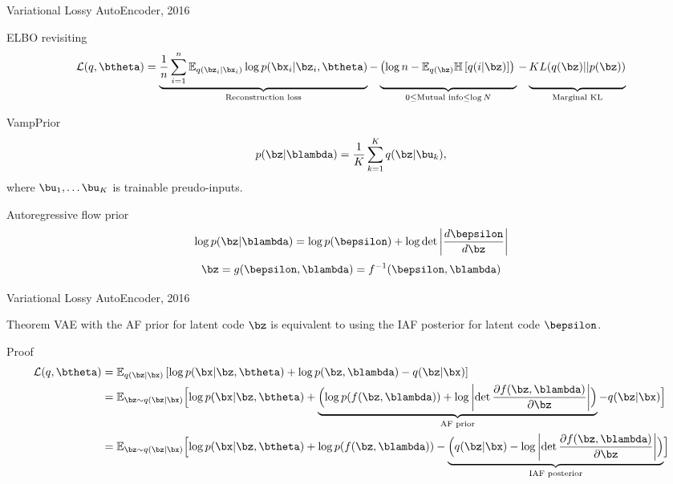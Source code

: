 \begin{frame}{Variational Lossy AutoEncoder, 2016}
	
	\begin{block}{ELBO revisiting}
		\vspace{-0.3cm}
		{\footnotesize
			\[
			\mathcal{L}(q, \btheta) = \underbrace{\frac{1}{n} \sum_{i=1}^n \mathbb{E}_{q(\bz_i | \bx_i)} \log p(\bx_i | \bz_i, \btheta)}_{\text{Reconstruction loss}} - \underbrace{\left(\log n - \mathbb{E}_{q(\bz)} \mathbb{H} \left[ q(i | \bz) \right] \right)\vphantom{\sum_{i=1}}}_{0 \leq \text{Mutual info} \leq \log N } - \underbrace{KL(q(\bz) || p(\bz))\vphantom{\sum_{i=1}}}_{\text{Marginal KL}}
			\]}
	\end{block}
	\vspace{-0.5cm}
	\begin{block}{VampPrior}
		\vspace{-0.5cm}
		\[
			p(\bz | \blambda) = \frac{1}{K} \sum_{k=1}^K q(\bz | \bu_k),
		\]
	where $\bu_1, \dots \bu_K$ is trainable preudo-inputs.
	\end{block}
	\begin{block}{Autoregressive flow prior}
		\vspace{-0.5cm}
		\[
			\log p(\bz | \blambda) = \log p(\bepsilon) + \log \det \left | \frac{d \bepsilon}{d\bz}\right|
		\]
		\[
			\bz = g(\bepsilon, \blambda) = f^{-1}(\bepsilon, \blambda) 
		\]
	\end{block}
\end{frame}
\begin{frame}{Variational Lossy AutoEncoder, 2016}
	\begin{block}{Theorem}
	VAE with the AF prior for latent code $\bz$ is equivalent to using the IAF posterior for latent code $\bepsilon$.
	\end{block}
	\begin{block}{Proof}
	\vspace{-0.5cm}
	{\footnotesize
	\begin{align*}
	\mathcal{L}(q, \btheta) &= \mathbb{E}_{q(\bz | \bx)} \left[ \log p(\bx | \bz, \btheta) +  \log p(\bz, \blambda) - q(\bz | \bx) \right] \\
	&= \mathbb{E}_{\bz \sim q(\bz | \bx)} \Bigl[ \log p(\bx | \bz, \btheta) + \underbrace{ \Bigl( \log p(f(\bz, \blambda)) + \log \left| \det \frac{\partial f(\bz, \blambda)}{\partial \bz} \right| \Bigr) }_{\text{AF prior}} - q(\bz | \bx) \Bigr] \\
	&= \mathbb{E}_{\bz \sim q(\bz | \bx)} \Bigl[ \log p(\bx | \bz, \btheta) +  \log p(f(\bz, \blambda)) - \underbrace{ \Bigl( q(\bz | \bx) - \log \left| \det \frac{\partial f(\bz, \blambda)}{\partial \bz} \right| \Bigr) }_{\text{IAF posterior}} \Bigr]
	\end{align*}
	}
	\end{block}
\end{frame}

